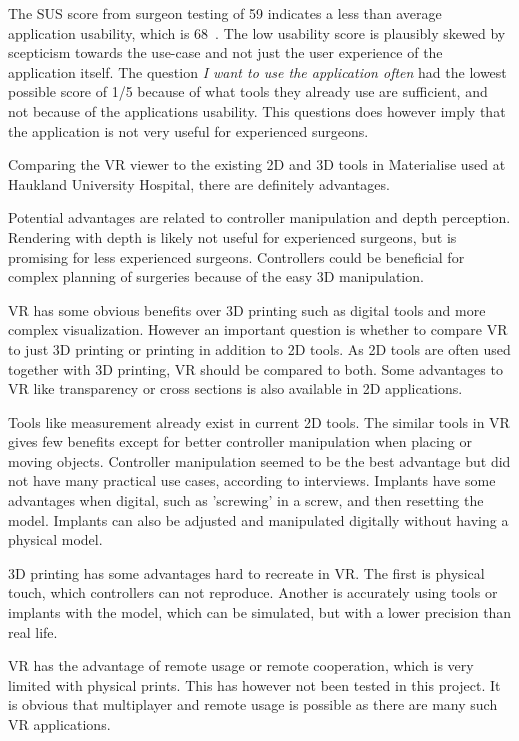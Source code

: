 \documentclass[a4paper]{report}
\begin{document}
The SUS score from surgeon testing of 59 indicates a less than average application usability, which is 68~\cite{system_usability_scale_sus_system_2013}. The low usability score is plausibly skewed by scepticism towards the use-case and not just the user experience of the application itself. The question \emph{I want to use the application often} had the lowest possible score of 1/5 because of what tools they already use are sufficient, and not because of the applications usability. This questions does however imply that the application is not very useful for experienced surgeons.

Comparing the VR viewer to the existing 2D and 3D tools in Materialise used at Haukland University Hospital, there are definitely advantages.

Potential advantages are related to controller manipulation and depth perception. Rendering with depth is likely not useful for experienced surgeons, but is promising for less experienced surgeons.
Controllers could be beneficial for complex planning of surgeries because of the easy 3D manipulation.

VR has some obvious benefits over 3D printing such as digital tools and more complex visualization.
However an important question is whether to compare VR to just 3D printing or printing in addition to 2D tools. As 2D tools are often used together with 3D printing, VR should be compared to both. Some advantages to VR like transparency or cross sections is also available in 2D applications.

Tools like measurement already exist in current 2D tools. The similar tools in VR gives few benefits except for better controller manipulation when placing or moving objects.
Controller manipulation seemed to be the best advantage but did not have many practical use cases, according to interviews.
Implants have some advantages when digital, such as 'screwing' in a screw, and then resetting the model. Implants can also be adjusted and manipulated digitally without having a physical model.

3D printing has some advantages hard to recreate in VR. The first is physical touch, which controllers can not reproduce. Another is accurately using tools or implants with the model, which can be simulated, but with a lower precision than real life.

VR has the advantage of remote usage or remote cooperation, which is very limited with physical prints. This has however not been tested in this project. It is obvious that multiplayer and remote usage is possible as there are many such VR applications.
\end{document}
